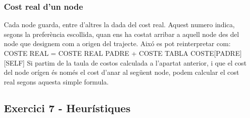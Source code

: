 \documentclass[a4paper,12pt]{article}
\begin{document}
            \subsubsection{Cost real d’un node}

                Cada node guarda, entre d’altres la dada del cost real. Aquest numero indica, segons la preferència escollida, quan ens ha costat arribar a aquell node des del node que designem com a origen del trajecte. Aixó es pot reinterpretar com: COSTE REAL = COSTE REAL PADRE + COSTE TABLA COSTE[PADRE][SELF]
                Si partim de la taula de costos calculada a l’apartat anterior, i que el cost del node orígen és només el cost d’anar al següent node, podem calcular el cost real segons aquesta simple formula.
    
        \subsection{Exercici 7 - Heurístiques}
\end{document}
